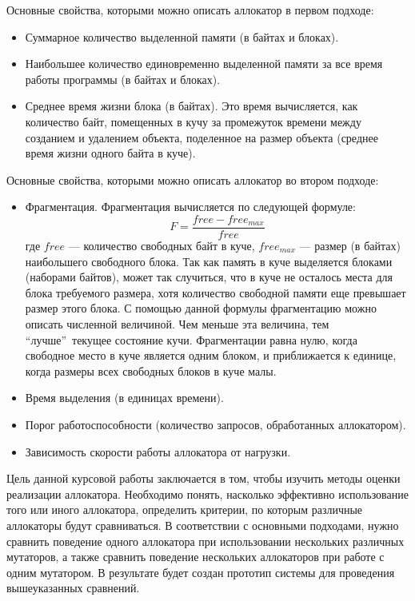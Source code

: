    Основные свойства, которыми можно описать аллокатор в первом подходе:
   \begin{itemize}
   \item Суммарное количество выделенной памяти (в байтах и блоках).
   \item Наибольшее количество единовременно выделенной памяти за все время работы программы (в байтах и блоках).
   \item Среднее время жизни блока (в байтах). Это время вычисляется, как количество байт, помещенных в кучу за промежуток времени между 
   созданием и удалением объекта, поделенное на размер объекта (среднее время жизни одного байта в куче).
   \end{itemize}
   
   Основные свойства, которыми можно описать аллокатор во втором подходе:
   \begin{itemize}
   \item Фрагментация. Фрагментация вычисляется по следующей формуле: \[ F = \frac{free - free_{max}}{free} \]
   где $free$ --- количество свободных байт в куче, $free_{max}$ --- размер (в байтах) наибольшего свободного блока.  Так как память в куче выделяется
   блоками (наборами байтов), может так случиться, что в куче не осталось места для блока требуемого размера, хотя количество свободной 
   памяти еще превышает размер этого блока. С помощью данной формулы фрагментацию можно описать численной величиной. Чем меньше эта
   величина, тем \textquotedblleft лучше\textquotedblright~текущее состояние кучи. Фрагментации равна нулю, когда свободное место в 
   куче является одним блоком, и приближается к единице, когда размеры всех свободных блоков в куче малы. 
   \item Время выделения (в единицах времени).
   \item Порог работоспособности (количество запросов, обработанных аллокатором).
   \item Зависимость скорости работы аллокатора от нагрузки.
   \end{itemize}
    
   Цель данной курсовой работы заключается в том, чтобы изучить методы оценки реализации аллокатора. Необходимо понять, насколько 
   эффективно использование того или иного аллокатора, определить критерии, по которым различные аллокаторы будут сравниваться. В 
   соответствии с основными подходами, нужно сравнить поведение одного аллокатора при использовании нескольких различных мутаторов, а также
   сравнить поведение нескольких аллокаторов при работе с одним мутатором. В результате будет создан прототип системы для проведения 
   вышеуказанных сравнений.
   
